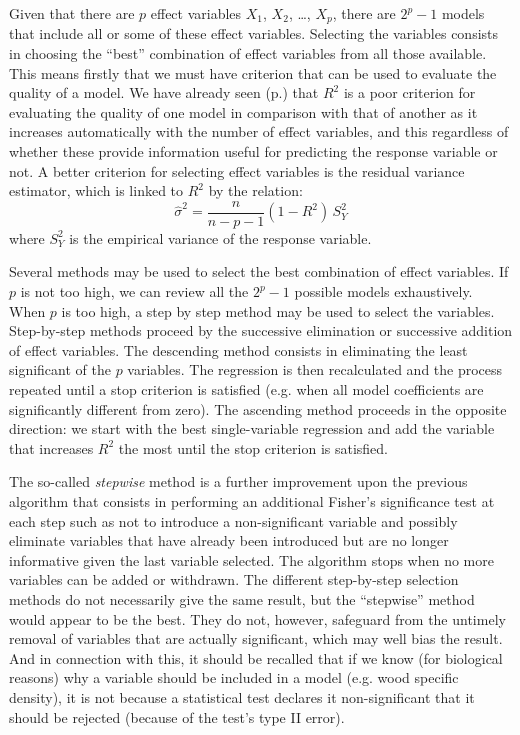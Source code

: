 Given that there are $p$ effect variables $X_1$, $X_2$, \ldots, $X_p$, there are $2^p-1$ models that include all or some of these effect variables. Selecting the variables consists in choosing the ``best'' combination of effect variables from all those available. This means firstly that we must have criterion that can be used to evaluate the quality of a model. We have already seen (p.\pageref{irm}) that $R^2$ is a poor criterion for evaluating the quality of one model in comparison with that of another as it increases automatically with the number of effect variables, and this regardless of whether these provide information useful for predicting the response variable or not. A better criterion for selecting effect variables is the residual variance estimator, which is linked to $R^2$ by the relation:
\[
\hat{\sigma}^2=\frac{n}{n-p-1}(1-R^2)\,S_Y^2
\]
where $S_Y^2$ is the empirical variance of the response variable.

Several methods may be used to select the best combination of effect variables. If $p$ is not too high, we can review all the $2^p-1$ possible models exhaustively. When $p$ is too high, a step by step method may be used to select the variables. Step-by-step methods proceed by the successive elimination or successive addition of effect variables. The descending method consists in eliminating the least significant of the $p$ variables. The regression is then recalculated and the process repeated until a stop criterion is satisfied (e.g. when all model coefficients are significantly different from zero). The ascending method proceeds in the opposite direction: we start with the best single-variable regression and add the variable that increases $R^2$ the most until the stop criterion is satisfied.

The so-called \emph{stepwise} method is a further improvement upon the previous algorithm that consists in performing an additional Fisher's significance test at each step such as not to introduce a non-significant variable and possibly eliminate variables that have already been introduced but are no longer informative given the last variable selected. The algorithm stops when no more variables can be added or withdrawn. The different step-by-step selection methods do not necessarily give the same result, but the ``stepwise'' method would appear to be the best. They do not, however, safeguard from the untimely removal of variables that are actually significant, which may well bias the result. And in connection with this, it should be recalled that if we know (for biological reasons) why a variable should be included in a model (e.g. wood specific density), it is not because a statistical test declares it non-significant that it should be rejected (because of the test's type II error).

